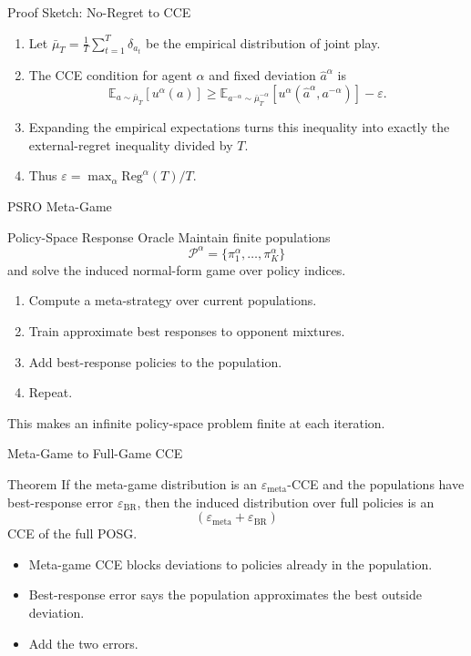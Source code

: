 \documentclass[10pt,aspectratio=169]{beamer}
\begin{document}
\begin{frame}{Proof Sketch: No-Regret to CCE}
\small
\begin{enumerate}
  \item Let $\bar\mu_T=\frac1T\sum_{t=1}^T\delta_{a_t}$ be the empirical distribution of joint play.
  \item The CCE condition for agent $\alpha$ and fixed deviation $\hat a^\alpha$ is
  \[
  \mathbb{E}_{a\sim\bar\mu_T}[u^\alpha(a)]
  \ge
  \mathbb{E}_{a^{-\alpha}\sim\bar\mu_T^{-\alpha}}[u^\alpha(\hat a^\alpha,a^{-\alpha})]-\varepsilon.
  \]
  \item Expanding the empirical expectations turns this inequality into exactly the external-regret inequality divided by $T$.
  \item Thus $\varepsilon=\max_\alpha \mathrm{Reg}^\alpha(T)/T$.
\end{enumerate}
\end{frame}

\begin{frame}{PSRO Meta-Game}
\small
\begin{block}{Policy-Space Response Oracle}
Maintain finite populations
\[
\mathcal{P}^\alpha=\{\pi^\alpha_1,\ldots,\pi^\alpha_K\}
\]
and solve the induced normal-form game over policy indices.
\end{block}

\begin{enumerate}
  \item Compute a meta-strategy over current populations.
  \item Train approximate best responses to opponent mixtures.
  \item Add best-response policies to the population.
  \item Repeat.
\end{enumerate}

\vspace{0.3em}
This makes an infinite policy-space problem finite at each iteration.
\end{frame}

\begin{frame}{Meta-Game to Full-Game CCE}
\small
\begin{block}{Theorem}
If the meta-game distribution is an $\varepsilon_{\mathrm{meta}}$-CCE and the populations have best-response error $\varepsilon_{\mathrm{BR}}$, then the induced distribution over full policies is an
\[
(\varepsilon_{\mathrm{meta}}+\varepsilon_{\mathrm{BR}})
\]
CCE of the full POSG.
\end{block}

\begin{itemize}
  \item Meta-game CCE blocks deviations to policies already in the population.
  \item Best-response error says the population approximates the best outside deviation.
  \item Add the two errors.
\end{itemize}
\end{frame}
\end{document}
